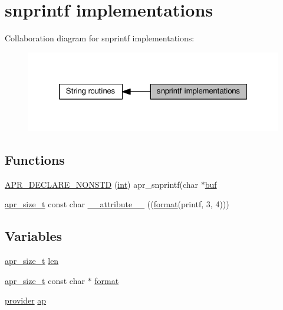 \hypertarget{group__APR__Strings__Snprintf}{}\section{snprintf implementations}
\label{group__APR__Strings__Snprintf}
Collaboration diagram for snprintf implementations\+:
\nopagebreak
\begin{figure}[H]
\begin{center}
\leavevmode
\includegraphics[width=319pt]{group__APR__Strings__Snprintf}
\end{center}
\end{figure}
\subsection*{Functions}
\begin{DoxyCompactItemize}
\item 
\hyperlink{group__APR__Strings__Snprintf_ga0dc3cc1193c72c91053f32d5ed97f88d}{A\+P\+R\+\_\+\+D\+E\+C\+L\+A\+R\+E\+\_\+\+N\+O\+N\+S\+TD} (\hyperlink{pcre_8txt_a42dfa4ff673c82d8efe7144098fbc198}{int}) apr\+\_\+snprintf(char $\ast$\hyperlink{group__APR__Util__Bucket__Brigades_gae92da6cbed6002407731bd51f7c6b984}{buf}
\item 
\hyperlink{group__apr__platform_gaaa72b2253f6f3032cefea5712a27540e}{apr\+\_\+size\+\_\+t} const char \hyperlink{group__APR__Strings__Snprintf_ga767f277ea2c91fc4ab29752439d44ece}{\+\_\+\+\_\+attribute\+\_\+\+\_\+} ((\hyperlink{group__apr__time_ga6427c3237144d9709aa13825289f0b78}{format}(printf, 3, 4)))
\end{DoxyCompactItemize}
\subsection*{Variables}
\begin{DoxyCompactItemize}
\item 
\hyperlink{group__apr__platform_gaaa72b2253f6f3032cefea5712a27540e}{apr\+\_\+size\+\_\+t} \hyperlink{group__APR__Strings__Snprintf_ga7aaae9d6ec4ff865ec20a5ca802dc3af}{len}
\item 
\hyperlink{group__apr__platform_gaaa72b2253f6f3032cefea5712a27540e}{apr\+\_\+size\+\_\+t} const char $\ast$ \hyperlink{group__APR__Strings__Snprintf_gafa8d2f476d8295cbd359245828f5d041}{format}
\item 
\hyperlink{group__MOD__DAV_gaf0b2e32aa25087ef77626ce8bb9d7aa4}{provider} \hyperlink{group__APR__Strings__Snprintf_ga21ecbc810cd93b85a818c96ca2f92f1a}{ap}
\end{DoxyCompactItemize}


